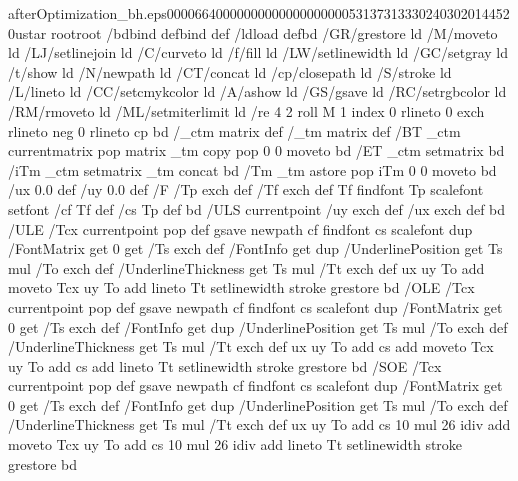 afterOptimization_bh.eps                                                                            0000664 0000000 0000000 00000531373 13330240302 014452  0                                                                                                    ustar   root                            root                                                                                                                                                                                                                   %
/bd{bind def}bind def
/ld{load def}bd
/GR/grestore ld
/M/moveto ld
/LJ/setlinejoin ld
/C/curveto ld
/f/fill ld
/LW/setlinewidth ld
/GC/setgray ld
/t/show ld
/N/newpath ld
/CT/concat ld
/cp/closepath ld
/S/stroke ld
/L/lineto ld
/CC/setcmykcolor ld
/A/ashow ld
/GS/gsave ld
/RC/setrgbcolor ld
/RM/rmoveto ld
/ML/setmiterlimit ld
/re {4 2 roll M
1 index 0 rlineto
0 exch rlineto
neg 0 rlineto
cp } bd
/_ctm matrix def
/_tm matrix def
/BT { _ctm currentmatrix pop matrix _tm copy pop 0 0 moveto } bd
/ET { _ctm setmatrix } bd
/iTm { _ctm setmatrix _tm concat } bd
/Tm { _tm astore pop iTm 0 0 moveto } bd
/ux 0.0 def
/uy 0.0 def
/F {
  /Tp exch def
  /Tf exch def
  Tf findfont Tp scalefont setfont
  /cf Tf def  /cs Tp def
} bd
/ULS {currentpoint /uy exch def /ux exch def} bd
/ULE {
  /Tcx currentpoint pop def
  gsave
  newpath
  cf findfont cs scalefont dup
  /FontMatrix get 0 get /Ts exch def /FontInfo get dup
  /UnderlinePosition get Ts mul /To exch def
  /UnderlineThickness get Ts mul /Tt exch def
  ux uy To add moveto  Tcx uy To add lineto
  Tt setlinewidth stroke
  grestore
} bd
/OLE {
  /Tcx currentpoint pop def
  gsave
  newpath
  cf findfont cs scalefont dup
  /FontMatrix get 0 get /Ts exch def /FontInfo get dup
  /UnderlinePosition get Ts mul /To exch def
  /UnderlineThickness get Ts mul /Tt exch def
  ux uy To add cs add moveto Tcx uy To add cs add lineto
  Tt setlinewidth stroke
  grestore
} bd
/SOE {
  /Tcx currentpoint pop def
  gsave
  newpath
  cf findfont cs scalefont dup
  /FontMatrix get 0 get /Ts exch def /FontInfo get dup
  /UnderlinePosition get Ts mul /To exch def
  /UnderlineThickness get Ts mul /Tt exch def
  ux uy To add cs 10 mul 26 idiv add moveto Tcx uy To add cs 10 mul 26 idiv add lineto
  Tt setlinewidth stroke
  grestore
} bd

